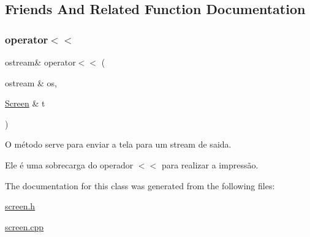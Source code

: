 \subsection{Friends And Related Function Documentation}
\mbox{\label{class_screen_aab6a2880746bfe1b7964817cc8f0989e}} 
\subsubsection{\texorpdfstring{operator$<$$<$}{operator<<}}
{\footnotesize\ttfamily ostream\& operator$<$$<$ (\begin{DoxyParamCaption}\item[{ostream \&}]{os,  }\item[{\hyperlink{class_screen}{Screen} \&}]{t }\end{DoxyParamCaption})\hspace{0.3cm}{\ttfamily [friend]}}



O método serve para enviar a tela para um stream de saida. 

Ele é uma sobrecarga do operador $<$$<$ para realizar a impressão. 

The documentation for this class was generated from the following files\+:\begin{DoxyCompactItemize}
\item 
\hyperlink{screen_8h}{screen.\+h}\item 
\hyperlink{screen_8cpp}{screen.\+cpp}\end{DoxyCompactItemize}
